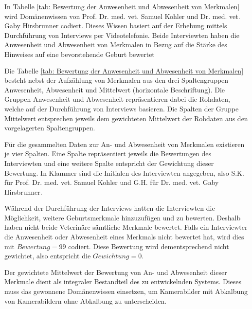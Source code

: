 In Tabelle \ref{tab: Bewertung der Anwesenheit und Abwesenheit von Merkmalen} wird Domänenwissen von Prof. Dr. med. vet. Samuel Kohler und  Dr. med. vet. Gaby Hirsbrunner codiert. Dieses Wissen basiert auf der Erhebung mittels Durchführung von Interviews per Videotelefonie. Beide Interviewten haben die Anwesenheit und Abwesenheit von Merkmalen in Bezug auf die Stärke des Hinweises auf eine bevorstehende Geburt bewertet

Die Tabelle \ref{tab: Bewertung der Anwesenheit und Abwesenheit von Merkmalen} besteht nebst der Aufzählung von Merkmalen aus den drei Spaltengruppen \flqq{}Anwesenheit\frqq{}, \flqq{}Abwesenheit\frqq{} und \flqq{}Mittelwert\frqq{} (horizontale Beschriftung). Die Gruppen Anwesenheit und Abwesenheit repräsentieren dabei die Rohdaten, welche auf der Durchführung von Interviews basieren. Die Spalten der Gruppe Mittelwert entsprechen jeweils dem gewichteten Mittelwert der Rohdaten aus den vorgelagerten Spaltengruppen.

Für die gesammelten Daten zur An- und Abwesenheit von Merkmalen existieren je vier Spalten. Eine Spalte repräsentiert jeweils die Bewertungen des Interviewten und eine weitere Spalte entspricht der Gewichtung dieser Bewertung. In Klammer sind die Initialen des Interviewten angegeben, also S.K. für Prof. Dr. med. vet. Samuel Kohler und  G.H. für Dr. med. vet. Gaby Hirsbrunner.

Während der Durchführung der Interviews hatten die Interviewten die Möglichkeit, weitere Geburtsmerkmale hinzuzufügen und zu bewerten. Deshalb haben nicht beide Veterinäre sämtliche Merkmale bewertet. Falls ein Interviewter die Anwesenheit oder Abwesenheit eines Merkmals nicht bewertet hat, wird dies mit $Bewertung=99$ codiert. Diese Bewertung wird dementsprechend nicht gewichtet, also entspricht die $Gewichtung=0$. 

Der gewichtete Mittelwert der Bewertung von An- und Abwesenheit dieser Merkmale dient als integraler Bestandteil des zu entwickelnden Systems. Dieses muss das gewonnene Domänenwissen einsetzen, um Kamerabilder mit Abkalbung von Kamerabildern ohne Abkalbung zu unterscheiden.



